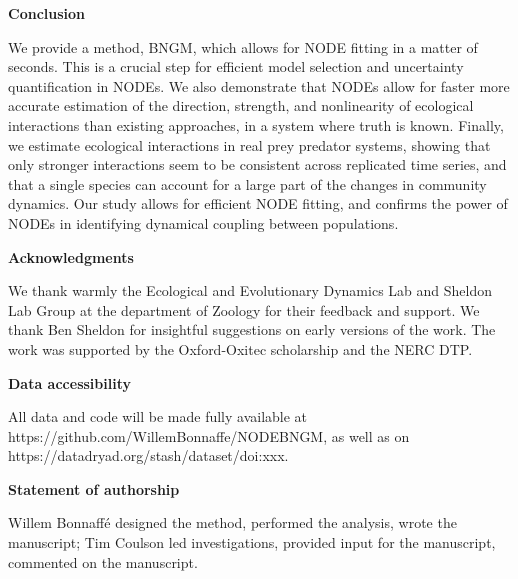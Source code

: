 \documentclass[11pt, oneside]{article}
\begin{document}
\textbf{Conclusion}

We provide a method, BNGM, which allows for NODE fitting in a matter of seconds.
This is a crucial step for efficient model selection and uncertainty quantification in NODEs.
We also demonstrate that NODEs allow for faster more accurate estimation of the direction, strength, and nonlinearity of ecological interactions than existing approaches, in a system where truth is known.
Finally, we estimate ecological interactions in real prey predator systems, showing that only stronger interactions seem to be consistent across replicated time series, and that a single species can account for a large part of the changes in community dynamics.
Our study allows for efficient NODE fitting, and confirms the power of NODEs in identifying dynamical coupling between populations. 

\textbf{Acknowledgments}

We thank warmly the Ecological and Evolutionary Dynamics Lab and Sheldon Lab Group at the department of Zoology for their feedback and support.
We thank Ben Sheldon for insightful suggestions on early versions of the work.
The work was supported by the Oxford-Oxitec scholarship and the NERC DTP.

\textbf{Data accessibility}

All data and code will be made fully available at https://github.com/WillemBonnaffe/NODEBNGM, as well as on https://datadryad.org/stash/dataset/doi:xxx.

\textbf{Statement of authorship}

Willem Bonnaff\'e designed the method, performed the analysis, wrote the manuscript; 
Tim Coulson led investigations, provided input for the manuscript, commented on the manuscript.

\printbibliography 

\newpage
{}
\end{document}

